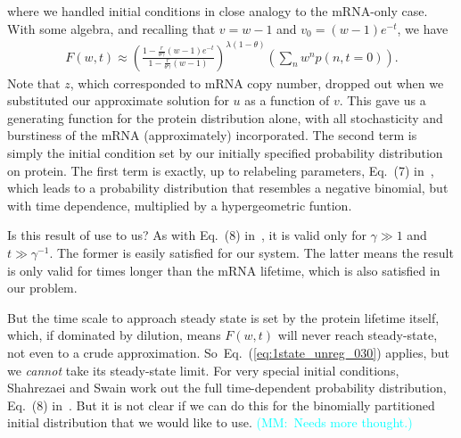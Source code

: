 \documentclass[12pt]{article}%
\newcommand{\mmnote}[1]{\textcolor{cyan}{(MM:~#1)}}
\newcommand{\eref}[1]{Eq.~(\ref{#1})}
\begin{document}
where we handled initial conditions in close analogy to the mRNA-only case.
With some algebra, and recalling that $v=w-1$ and $v_0=(w-1)e^{-t}$, we have
\begin{align}
F(w,t) \approx \left(\frac{1-\frac{r}{\theta\gamma}(w-1)e^{-t}}
                {1-\frac{r}{\theta\gamma}(w-1)}\right)^{\lambda(1-\theta)}
                \left(\sum_n w^n p(n,t=0)\right).
\label{eq:1state_unreg_030}
\end{align}
Note that $z$, which corresponded to mRNA copy number, dropped out when
we substituted our approximate solution for $u$ as a function of $v$.
This gave us a generating function for the protein distribution alone,
with all stochasticity and burstiness of the mRNA (approximately)
incorporated. The second term is simply the initial condition set by our
initially specified probability distribution on protein.
The first term is exactly, up to relabeling parameters, Eq.~(7)
in~\cite{Shahrezaei2008}, which leads to a probability distribution that
resembles a negative binomial, but with time dependence, multiplied by a
hypergeometric funtion.

Is this result of use to us? As with Eq.~(8) in~\cite{Shahrezaei2008},
it is valid only for $\gamma \gg 1$ and $t\gg \gamma^{-1}$.
The former is easily satisfied for our system. The latter means the result
is only valid for times longer than the mRNA lifetime,
which is also satisfied in our problem.

But the time scale to approach steady state is set by the protein
lifetime itself, which, if dominated by dilution, means $F(w,t)$ will
never reach steady-state, not even to a crude approximation.
So~\eref{eq:1state_unreg_030} applies, but we \textit{cannot} take its
steady-state limit. For very special initial conditions, Shahrezaei and
Swain work out the full time-dependent probability distribution, Eq.~(8)
in~\cite{Shahrezaei2008}. But it is not clear if we can do this for the
binomially partitioned initial distribution that we would like to use.
\mmnote{Needs more thought.}

\appendix


% 


\end{document}
